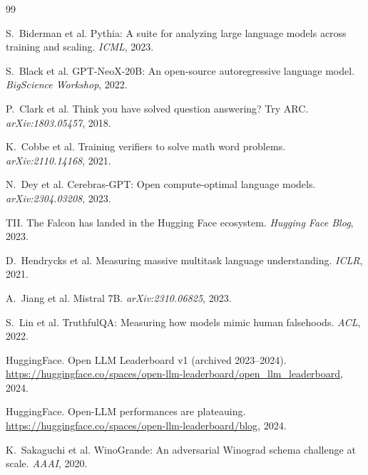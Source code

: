 \documentclass[11pt,a4paper]{article}
\begin{document}

\begin{thebibliography}{99}

S.~Biderman et al.
\newblock Pythia: A suite for analyzing large language models across training and scaling.
\newblock \emph{ICML}, 2023.

S.~Black et al.
\newblock GPT-NeoX-20B: An open-source autoregressive language model.
\newblock \emph{BigScience Workshop}, 2022.

P.~Clark et al.
\newblock Think you have solved question answering? Try ARC.
\newblock \emph{arXiv:1803.05457}, 2018.

K.~Cobbe et al.
\newblock Training verifiers to solve math word problems.
\newblock \emph{arXiv:2110.14168}, 2021.

N.~Dey et al.
\newblock Cerebras-GPT: Open compute-optimal language models.
\newblock \emph{arXiv:2304.03208}, 2023.

TII.
\newblock The Falcon has landed in the Hugging Face ecosystem.
\newblock \emph{Hugging Face Blog}, 2023.

D.~Hendrycks et al.
\newblock Measuring massive multitask language understanding.
\newblock \emph{ICLR}, 2021.

A.~Jiang et al.
\newblock Mistral 7B.
\newblock \emph{arXiv:2310.06825}, 2023.

S.~Lin et al.
\newblock TruthfulQA: Measuring how models mimic human falsehoods.
\newblock \emph{ACL}, 2022.

HuggingFace.
\newblock Open LLM Leaderboard v1 (archived 2023--2024).
\newblock \url{https://huggingface.co/spaces/open-llm-leaderboard/open_llm_leaderboard}, 2024.

HuggingFace.
\newblock Open-LLM performances are plateauing.
\newblock \url{https://huggingface.co/spaces/open-llm-leaderboard/blog}, 2024.

K.~Sakaguchi et al.
\newblock WinoGrande: An adversarial Winograd schema challenge at scale.
\newblock \emph{AAAI}, 2020.


\end{thebibliography}
\end{document}

